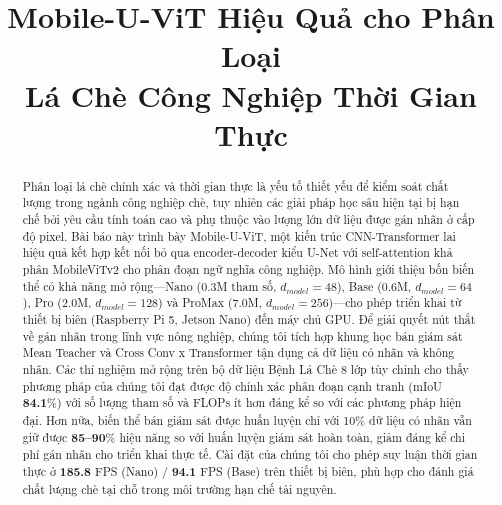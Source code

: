 \documentclass[conference]{IEEEtran}
\begin{document}
\title{Mobile-U-ViT Hiệu Quả cho Phân Loại\\Lá Chè Công Nghiệp Thời Gian Thực}

\author{
}

\maketitle


\begin{abstract}
Phân loại lá chè chính xác và thời gian thực là yếu tố thiết yếu để kiểm soát chất lượng trong ngành công nghiệp chè, tuy nhiên các giải pháp học sâu hiện tại bị hạn chế bởi yêu cầu tính toán cao và phụ thuộc vào lượng lớn dữ liệu được gán nhãn ở cấp độ pixel. Bài báo này trình bày Mobile-U-ViT, một kiến trúc CNN-Transformer lai hiệu quả kết hợp kết nối bỏ qua encoder-decoder kiểu U-Net với self-attention khả phân MobileViTv2 cho phân đoạn ngữ nghĩa công nghiệp. Mô hình giới thiệu bốn biến thể có khả năng mở rộng---Nano (0.3M tham số, $d_{model}=48$), Base (0.6M, $d_{model}=64$), Pro (2.0M, $d_{model}=128$) và ProMax (7.0M, $d_{model}=256$)---cho phép triển khai từ thiết bị biên (Raspberry Pi 5, Jetson Nano) đến máy chủ GPU. Để giải quyết nút thắt về gán nhãn trong lĩnh vực nông nghiệp, chúng tôi tích hợp khung học bán giám sát Mean Teacher và Cross Conv x Transformer tận dụng cả dữ liệu có nhãn và không nhãn. Các thí nghiệm mở rộng trên bộ dữ liệu Bệnh Lá Chè 8 lớp tùy chỉnh cho thấy phương pháp của chúng tôi đạt được độ chính xác phân đoạn cạnh tranh (mIoU \textbf{84.1}\%) với số lượng tham số và FLOPs ít hơn đáng kể so với các phương pháp hiện đại. Hơn nữa, biến thể bán giám sát được huấn luyện chỉ với 10\% dữ liệu có nhãn vẫn giữ được \textbf{85--90}\% hiệu năng so với huấn luyện giám sát hoàn toàn, giảm đáng kể chi phí gán nhãn cho triển khai thực tế. Cài đặt của chúng tôi cho phép suy luận thời gian thực ở \textbf{185.8} FPS (Nano) / \textbf{94.1} FPS (Base) trên thiết bị biên, phù hợp cho đánh giá chất lượng chè tại chỗ trong môi trường hạn chế tài nguyên.
\end{abstract}
\end{document}
